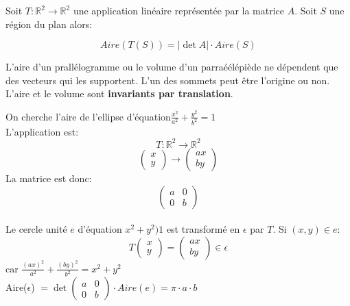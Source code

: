 \begin{theorem}
    Soit $T : \mathbb{R}^2 \to \mathbb{R}^2$  une application linéaire représentée par la matrice $A$. Soit $S$ une région du plan alors:
\begin{formule}
    \[Aire(T(S)) = |\det A| \cdot Aire(S)\]
\end{formule}
\end{theorem}
\begin{framedremark}
    L'aire d'un prallélogramme ou le volume d'un parraéélépiède ne dépendent que des vecteurs qui les supportent. L'un des sommets peut être l'origine ou non. L'aire et le volume sont \textbf{invariants par translation}.
\end{framedremark}
\begin{exemple}
    On cherche l'aire de l'ellipse d'équation$\frac{x^2}{a^2} + \frac{y^2}{b^2} = 1$
    \\
    L'application est:
    \[T: \mathbb{R}^2 \to \mathbb{R}^2 \]
    \[\begin{pmatrix}
        x \\ y
    \end{pmatrix} \to \begin{pmatrix}
        ax \\ by
    \end{pmatrix}\]
    La matrice est donc: 
    \[\begin{pmatrix}
        a & 0\\ 0 & b
    \end{pmatrix}\]
    \\
    Le cercle unité $e$ d'équation $x^2 + y^2 ) 1$ est transformé en $\epsilon$ par $T$. Si $(x, y) \in e$:
    \[T\begin{pmatrix}
        x \\ y
    \end{pmatrix} = \begin{pmatrix}
        ax \\ by
    \end{pmatrix} \in \epsilon\] car $\frac{(ax)^2}{a^2} + \frac{(by)^2}{b^2} = x^2 + y^2$
    \\
    Aire($\epsilon$) $= \det \begin{pmatrix}
        a & 0 \\ 0 & b
    \end{pmatrix} \cdot Aire(e) = \pi\cdot a \cdot b$
\end{exemple}




